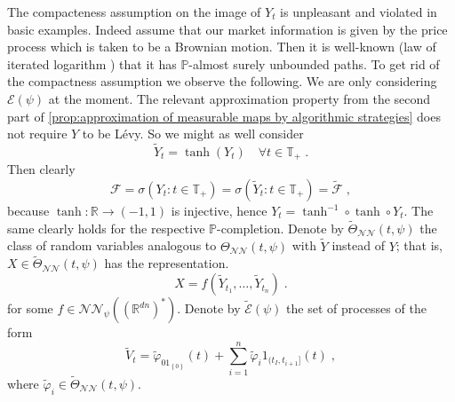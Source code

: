\documentclass[11pt]{report}
\theoremstyle{plain} %
\theoremstyle{definition} %
\theoremstyle{remark} %
\begin{document}
The compacteness assumption on the image of \(Y_t\) is unpleasant and violated in basic examples. Indeed assume that our market information is given by the price process which is taken to be a Brownian motion. Then it is well-known (law of iterated logarithm \parencite[Thm.~2.1]{Schweizer2025BrownianMotionStochasticCalculus}) that it has \(\mathbb{P}\)-almost surely unbounded paths. To get rid of the compactness assumption we observe the following. We are only considering \(\mathcal{E}(\psi)\) at the moment. The relevant approximation property from the second part of \cref{prop:approximation of measurable maps by algorithmic strategies} does not require \(Y\) to be Lévy. So we might as well consider 
\begin{equation}
    \widetilde{Y}_t=\tanh(Y_t)\quad\forall t\in\mathbb{T}_+\;.
\end{equation} 
Then clearly 
\begin{equation}
    \mathcal{F}=\sigma(Y_t:t\in\mathbb{T}_+)=\sigma(\widetilde{Y}_t:t\in\mathbb{T}_+)=\widetilde{\mathcal{F}}\;,
\end{equation}
because \(\tanh:\mathbb{R}\to(-1,1)\) is injective, hence \(Y_t=\tanh^{-1}\circ\tanh\circ Y_t\). The same clearly holds for the respective \(\mathbb{P}\)-completion. Denote by \(\widetilde{\Theta}_{\mathcal{NN}}(t,\psi)\) the class of random variables analogous to \(\Theta_{\mathcal{NN}}(t,\psi)\) with \(\widetilde{Y}\) instead of \(Y\); that is, \(X\in\widetilde{\Theta}_{\mathcal{NN}}(t,\psi)\) has the representation.
\begin{equation}
    X =f(\widetilde{Y}_{t_1},\dots, \widetilde{Y}_{t_n})\;.
\end{equation}
for some \(f\in\mathcal{NN}_{\psi}((\mathbb{R}^{dn})^*)\). 
Denote by \(\widetilde{\mathcal{E}}(\psi)\) the set of processes of the form
\begin{equation}
  \widetilde{V}_t=\widetilde{\varphi}_01_{\left\{0\right\}}(t)+\sum_{i=1}^n\widetilde{\varphi}_i1_{(t_I,t_{i+1}]}(t)\;,
  \end{equation}
 where \(\widetilde{\varphi}_i\in\widetilde{\Theta}_{\mathcal{NN}}(t,\psi)\).  
 \\\\
\end{document}
